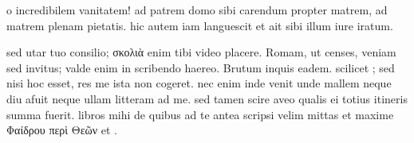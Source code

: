 


 o incredibilem vanitatem! ad patrem domo sibi carendum propter matrem, ad matrem plenam pietatis. hic autem iam languescit et ait sibi illum iure iratum.

 sed utar tuo consilio; σκολιὰ enim tibi video placere. Romam, ut censes, veniam sed invitus; valde enim in scribendo haereo. Brutum inquis eadem. scilicet ; sed nisi hoc esset, res me ista non cogeret. nec enim inde venit unde mallem neque diu afuit neque ullam litteram ad me. sed tamen scire aveo qualis ei totius itineris summa fuerit. libros mihi de quibus ad te antea scripsi velim mittas et maxime Φαίδρου περὶ Θεῶν et .
